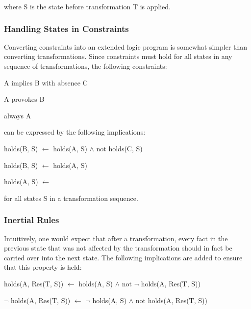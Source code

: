 \documentclass[a4paper]{article}
\begin{document}
        where S is the state before transformation T is applied.

      \subsubsection{Handling States in Constraints}

        Converting constraints into an extended logic program is somewhat
        simpler than converting transformations. Since constraints must hold
        for all states in any sequence of transformations, the following
        constraints:

      \begin{list}{}{}
        \item A implies B with absence C
        \item A provokes B
        \item always A
      \end{list}

        can be expressed by the following implications:

        \begin{list}{}{}
          \item 
            holds(B, S) $\leftarrow$ holds(A, S) $\land$ not holds(C, S)
          \item 
            holds(B, S) $\leftarrow$ holds(A, S)
          \item 
            holds(A, S) $\leftarrow$
        \end{list}

        for all states S in a transformation sequence.

      \subsubsection{Inertial Rules}

        Intuitively, one would expect that after a transformation, every fact
        in the previous state that was not affected by the transformation
        should in fact be carried over into the next state. The following
        implications are added to ensure that this property is held:

        \begin{list}{}{}
          \item
            holds(A, Res(T, S)) $\leftarrow$ holds(A, S) $\land$ not $\lnot$ 
            holds(A, Res(T, S))
          \item 
            $\lnot$ holds(A, Res(T, S)) $\leftarrow$ $\lnot$ holds(A, S) 
            $\land$ not holds(A, Res(T, S))
        \end{list}
\end{document}
